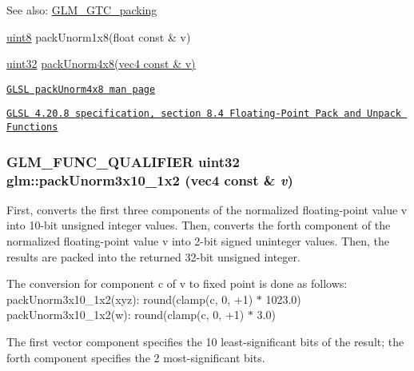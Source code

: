 \begin{Desc}
\item[See also:]\hyperlink{group__gtc__packing}{GLM\_\-GTC\_\-packing} 

\hyperlink{group__gtc__type__precision_g1a7dcd8aac97cc8020817c94049deff2}{uint8} packUnorm1x8(float const \& v) 

\hyperlink{group__gtc__type__precision_g202b6a53c105fcb7e531f9b443518451}{uint32} \hyperlink{group__core__func__packing_g834ee9a9e73dcb0a7c1fc88143f3edb8}{packUnorm4x8(vec4 const \& v)} 

\href{http://www.opengl.org/sdk/docs/manglsl/xhtml/packUnorm4x8.xml}{\tt GLSL packUnorm4x8 man page} 

\href{http://www.opengl.org/registry/doc/GLSLangSpec.4.20.8.pdf}{\tt GLSL 4.20.8 specification, section 8.4 Floating-Point Pack and Unpack Functions} \end{Desc}
\hypertarget{group__gtc__packing_g2cf2d11b40bd48639110456fd74c2e33}{
\subsubsection[packUnorm3x10\_\-1x2]{\setlength{\rightskip}{0pt plus 5cm}GLM\_\-FUNC\_\-QUALIFIER uint32 glm::packUnorm3x10\_\-1x2 (vec4 const \& {\em v})}}
\label{group__gtc__packing_g2cf2d11b40bd48639110456fd74c2e33}


First, converts the first three components of the normalized floating-point value v into 10-bit unsigned integer values. Then, converts the forth component of the normalized floating-point value v into 2-bit signed uninteger values. Then, the results are packed into the returned 32-bit unsigned integer.

The conversion for component c of v to fixed point is done as follows: packUnorm3x10\_\-1x2(xyz): round(clamp(c, 0, +1) $\ast$ 1023.0) packUnorm3x10\_\-1x2(w): round(clamp(c, 0, +1) $\ast$ 3.0)

The first vector component specifies the 10 least-significant bits of the result; the forth component specifies the 2 most-significant bits.

